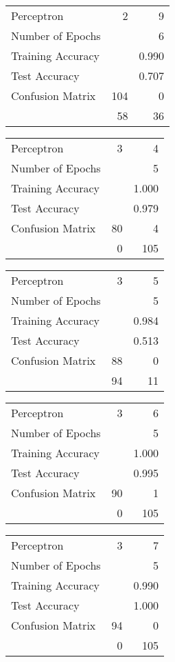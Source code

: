 \documentclass[11pt]{article}
\begin{document}
\begin{minipage}[t]{0.5\textwidth}
\begin{tabular}{|l | r r|}
\hline Perceptron & 2 & 9\\
Number of Epochs & & 6\\
Training Accuracy & & 0.990\\
Test Accuracy & & 0.707\\
Confusion Matrix & 104 & 0\\
 &58 & 36\\ \hline
\end{tabular}
\end{minipage}
\begin{minipage}[t]{0.5\textwidth}
\begin{tabular}{|l | r r|}
\hline Perceptron & 3 & 4\\
Number of Epochs & & 5\\
Training Accuracy & & 1.000\\
Test Accuracy & & 0.979\\
Confusion Matrix & 80 & 4\\
 &0 & 105\\ \hline
\end{tabular}
\end{minipage}
\begin{minipage}[t]{0.5\textwidth}
\begin{tabular}{|l | r r|}
\hline Perceptron & 3 & 5\\
Number of Epochs & & 5\\
Training Accuracy & & 0.984\\
Test Accuracy & & 0.513\\
Confusion Matrix & 88 & 0\\
 &94 & 11\\ \hline
\end{tabular}
\end{minipage}
\begin{minipage}[t]{0.5\textwidth}
\begin{tabular}{|l | r r|}
\hline Perceptron & 3 & 6\\
Number of Epochs & & 5\\
Training Accuracy & & 1.000\\
Test Accuracy & & 0.995\\
Confusion Matrix & 90 & 1\\
 &0 & 105\\ \hline
\end{tabular}
\end{minipage}
\begin{minipage}[t]{0.5\textwidth}
\begin{tabular}{|l | r r|}
\hline Perceptron & 3 & 7\\
Number of Epochs & & 5\\
Training Accuracy & & 0.990\\
Test Accuracy & & 1.000\\
Confusion Matrix & 94 & 0\\
 &0 & 105\\ \hline
\end{tabular}
\end{minipage}
\end{document}
